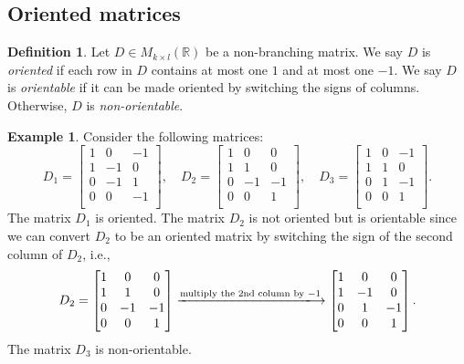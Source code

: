 \documentclass{article}
\theoremstyle{definition}
\newtheorem{definition}[theorem]{Definition}
\newtheorem{example}[theorem]{Example}
\begin{document}
\subsection{Oriented matrices}\label{subsec:non_branching_def}


\begin{definition}\label{def:orit_mtrx}
Let $D\in M_{k\times l}(\mathbb{R})$ be a non-branching matrix.
We say $D$ is \emph{oriented} if each row in $D$ contains at most one $1$ and at most one $-1$.
We say $D$ is \emph{orientable} if it can be made oriented by switching the signs of columns. Otherwise, $D$ is \emph{non-orientable}.
\end{definition}

\begin{example}
Consider the following matrices:
\[
D_1
=
\begin{bmatrix}
1 & 0  & -1 \\
1 & -1  & 0 \\
0 & -1 & 1 \\
0 & 0 & -1\\
\end{bmatrix},
\quad
D_2
=
\begin{bmatrix}
1 & 0  & 0 \\
1 & 1  & 0 \\
0 & -1 & -1 \\
0 & 0 & 1\\
\end{bmatrix},
\quad
D_3
=
\begin{bmatrix}
1 & 0  & -1 \\
1 & 1  & 0 \\
0 & 1 & -1 \\
0 & 0 & 1\\
\end{bmatrix}.
\]
The matrix $D_1$ is oriented. 
The matrix $D_2$ is not oriented but is orientable since we can convert $D_2$ to be an oriented matrix by switching the sign of the second column of $D_2$,
i.e.,
\[
D_2
=
\begin{bmatrix}
1 & 0  & 0 \\
1 & 1  & 0 \\
0 & -1 & -1 \\
0 & 0 & 1\\
\end{bmatrix}
\xlongrightarrow{\text{multiply the $2$nd column by $-1$}}
\begin{bmatrix}
1 & 0  & 0 \\
1 & -1  & 0 \\
0 & 1 & -1 \\
0 & 0 & 1\\
\end{bmatrix}.
\]
The matrix $D_3$ is non-orientable.
\end{example}
\end{document}
